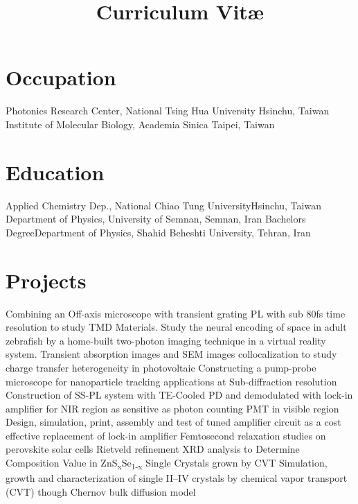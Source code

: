 \documentclass[11pt,a4paper]{moderncv}
\title{Curriculum Vit\ae}
\begin{document}
\makecvtitle
\vspace{-1.5cm}
\section{Occupation}
		{Photonics Research Center, \newline National Tsing Hua University}
		{Hsinchu, Taiwan}{}{}
		{Institute of Molecular Biology, \newline Academia Sinica}
		{Taipei, Taiwan}{}{}
\section{Education}
		{Applied Chemistry Dep., National Chiao
		Tung University}{Hsinchu, Taiwan}{}{}
		{Department of Physics, University of Semnan, Semnan, Iran}{}{}{}
		{Bachelors Degree}{Department of Physics, Shahid 
		Beheshti University, Tehran, Iran}{}{}{}
\section{Projects}

		{Combining an Off-axis microscope with 
		transient grating PL with sub 80fs time resolution 
		to study TMD Materials.}
		{Study the neural encoding of space in adult zebrafish 
		by a home-built two-photon 
		imaging technique in a virtual reality system.}
		{Transient absorption images and SEM images collocalization 
		to study charge transfer heterogeneity in photovoltaic}
		{Constructing a pump-probe microscope for nanoparticle tracking 
		applications at Sub-diffraction resolution}
		{Construction of SS-PL system with TE-Cooled PD 
		and demodulated with lock-in amplifier for NIR region as 
		sensitive as photon counting PMT in visible region}
		{Design, simulation, print, assembly and test 
		of tuned amplifier circuit as a cost effective replacement 
		of lock-in amplifier}
		{Femtosecond relaxation studies on perovskite solar cells}
		{Rietveld refinement XRD analysis to 
		Determine Composition Value in ZnS\textsubscript{x}Se\textsubscript{1-x} 
		Single Crystals grown by CVT}
		{Simulation, growth and characterization 
		of single II--IV crystals 
		by chemical vapor transport (CVT) though Chernov bulk diffusion model}
\end{document}
